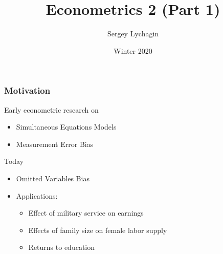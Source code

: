\documentclass[pdftex]{beamer}
\title[Instrumental Variables]{Econometrics 2 (Part 1)}
\author[Lychagin  \& Mu\c co]{Sergey Lychagin}
\institute[CEU]{Central European University}
\date{Winter 2020}
\begin{document}
\frame{\titlepage}



\begin{frame}
\frametitle{Motivation}
Early econometric research on 
\begin{itemize}
\item Simultaneous Equations Models
\item Measurement Error Bias
\end{itemize}
Today
\begin{itemize}
\item Omitted Variables Bias
\end{itemize}
\begin{itemize}
%
\item Applications:
         \begin{itemize}
           \item Effect of military service on earnings
           \item Effects of family size on female labor supply
           \item Returns to education
         \end{itemize}

\end{itemize}
\end{frame}


\end{document}
